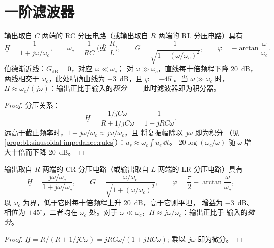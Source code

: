 \section{一阶滤波器}

\begin{proposition}[一阶低通滤波器]\label{prop:b1:filters-transfer-functions:lowpass1}
输出取自 $C$ 两端的 RC 分压电路（或输出取自
$R$ 两端的 RL 分压电路）具有
\[
\underline H = \frac{1}{1 + j\omega/\omega_c}, \qquad
\omega_c = \frac{1}{RC} \ \Big(\text{或 } \frac{R}{L}\Big),
\qquad G = \frac{1}{\sqrt{1 + (\omega/\omega_c)^2}}, \qquad
\varphi = -\arctan\frac{\omega}{\omega_c} .
\]
伯德渐近线：$G_{\mathrm{dB}} = 0$，对应 $\omega \ll \omega_c$；
对 $\omega \gg \omega_c$，直线每十倍频程下降 \qty{20}{dB}，
两线相交于 $\omega_c$，此处精确曲线为 \qty{-3}{dB}，且
$\varphi = -45^\circ$。当 $\omega \gg \omega_c$ 时，$\underline H \approx
\omega_c/(j\omega)$：输出正比于输入的\emph{积分}
——此时滤波器即为积分器。
\end{proposition}

\begin{proof}
分压关系：
\[
\underline H = \frac{1/jC\omega}{R + 1/jC\omega} = \frac{1}{1 + jRC\omega} .
\]
远高于截止频率时，$1 + j\omega/\omega_c \approx j\omega/\omega_c$，且
将复振幅除以 $j\omega$ 即为积分
（见\cref{prop:b1:sinusoidal-impedance:rules}）：$u_s \approx \omega_c\int u_e\,\dd t$。
$20\log(\omega_c/\omega)$ 随 $\omega$ 增大十倍而下降 \qty{20}{dB}。
\end{proof}

\begin{proposition}[一阶高通滤波器]\label{prop:b1:filters-transfer-functions:highpass1}
输出取自 $R$ 两端的 CR 分压电路（或输出取自
$L$ 两端的 LR 分压电路）具有
\[
\underline H = \frac{j\omega/\omega_c}{1 + j\omega/\omega_c},
\qquad G = \frac{\omega/\omega_c}{\sqrt{1 + (\omega/\omega_c)^2}},
\qquad \varphi = \frac{\pi}{2} - \arctan\frac{\omega}{\omega_c},
\]
以 $\omega_c$ 为界，低于它时每十倍频程上升 \qty{20}{dB}，高于它则平坦，
增益为 \qty{-3}{dB}、相位为 $+45^\circ$，二者均在 $\omega_c$ 处。对于 $\omega \ll \omega_c$，$\underline H
\approx j\omega/\omega_c$：输出正比于
输入的\emph{微分}。
\end{proposition}

\begin{proof}
$\underline H = R/(R + 1/jC\omega) = jRC\omega/(1 + jRC\omega)$;
乘以 $j\omega$ 即为微分。
\end{proof}


